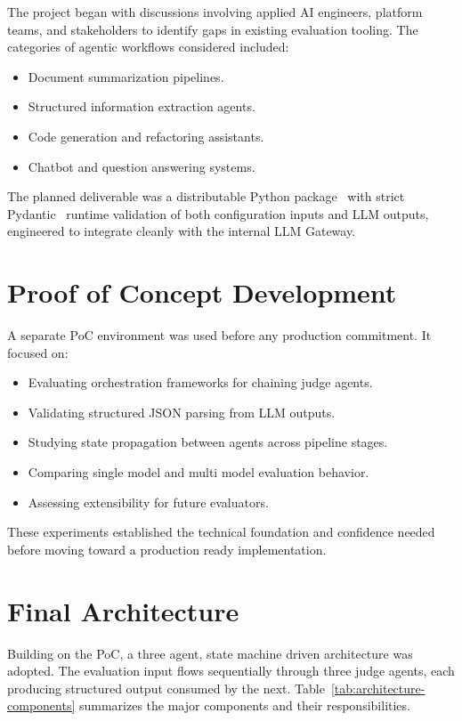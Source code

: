 \documentclass[12pt, a4paper, oneside]{report}
\begin{document}
The project began with discussions involving applied AI engineers, platform teams, and stakeholders to identify gaps in existing evaluation tooling. The categories of agentic workflows considered included:

\begin{itemize}
    \item Document summarization pipelines.
    \item Structured information extraction agents.
    \item Code generation and refactoring assistants.
    \item Chatbot and question answering systems.
\end{itemize}

The planned deliverable was a distributable Python package~\cite{pypa} with strict Pydantic~\cite{pydantic} runtime validation of both configuration inputs and LLM outputs, engineered to integrate cleanly with the internal LLM Gateway.

\section{Proof of Concept Development}

A separate PoC environment was used before any production commitment. It focused on:

\begin{itemize}
    \item Evaluating orchestration frameworks for chaining judge agents.
    \item Validating structured JSON parsing from LLM outputs.
    \item Studying state propagation between agents across pipeline stages.
    \item Comparing single model and multi model evaluation behavior.
    \item Assessing extensibility for future evaluators.
\end{itemize}

These experiments established the technical foundation and confidence needed before moving toward a production ready implementation.

\section{Final Architecture}

Building on the PoC, a three agent, state machine driven architecture was adopted. The evaluation input flows sequentially through three judge agents, each producing structured output consumed by the next. Table~\ref{tab:architecture-components} summarizes the major components and their responsibilities.
\end{document}
